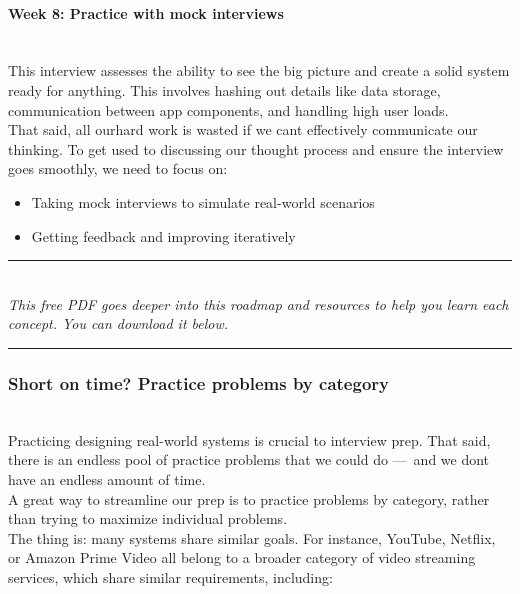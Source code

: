 \paragraph{Week 8: Practice with mock interviews}\label{oKVwCnIZ4xXocXOaZ8tHC}
\\
This interview assesses the ability to see the big picture and create a solid system ready for anything. This involves hashing out details like data storage, communication between app components, and handling high user loads.
\\
That said, all ourhard work is wasted if we can\textquotesingle t effectively communicate our thinking. To get used to discussing our thought process and ensure the interview goes smoothly, we need to focus on:

\begin{itemize}
\item
\protect{}\label{ZpU3tre4_IzU0XDtoJ4tT}
Taking mock interviews to simulate real-world scenarios
\item
\protect{}\label{xD0DVqFc26dxcKSLFE-E8}
Getting feedback and improving iteratively
\end{itemize}

\begin{center}\rule{0.5\linewidth}{0.5pt}\end{center}
\\
\emph{This free PDF goes deeper into this roadmap and resources to help you learn each concept. You can download it below.}

\begin{center}\rule{0.5\linewidth}{0.5pt}\end{center}

\subsubsection{Short on time? Practice problems by category}\label{WbaLnJWEWPAAk49aJmy8V}
\\
Practicing designing real-world systems is crucial to interview prep. That said, there is an endless pool of practice problems that we could do ---~and we don\textquotesingle t have an endless amount of time.
\\
A great way to streamline our prep is to practice problems by category, rather than trying to maximize individual problems.
\\
The thing is: many systems share similar goals. For instance, YouTube, Netflix, or Amazon Prime Video all belong to a broader category of video streaming services, which share similar requirements, including:

